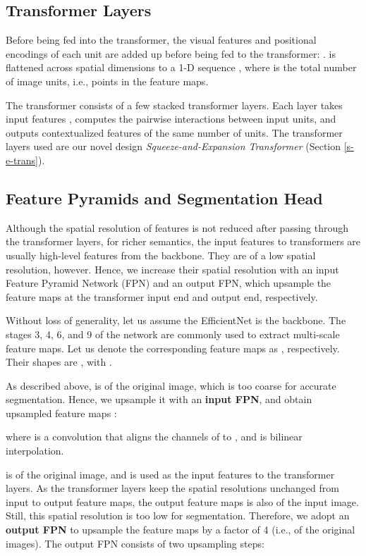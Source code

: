 \documentclass{article}
\begin{document}
\subsection{Transformer Layers}
Before being fed into the transformer, the visual features and positional encodings of each unit are added up before being fed to the transformer: . 
 is flattened across spatial dimensions to a 1-D sequence , where  is the total number of image units, i.e., points in the feature maps.

The transformer consists of a few stacked transformer layers. Each layer takes input features , computes the pairwise interactions between input units, and outputs contextualized features  of the same number of units.
The transformer layers used are our novel design \emph{Squeeze-and-Expansion Transformer} (Section \ref{s-e-trans}).

\subsection{Feature Pyramids and Segmentation Head}
Although the spatial resolution of features is not reduced after passing through the transformer layers, for richer semantics, the input features to transformers are usually high-level features from the backbone. They are of a low spatial resolution, however. Hence, we increase their spatial resolution with an input Feature Pyramid Network (FPN) \cite{panet} and an output FPN, which upsample the feature maps at the transformer input end and output end, respectively.

Without loss of generality, let us assume the EfficientNet is the backbone. The stages 3, 4, 6, and 9 of the network are commonly used to extract multi-scale feature maps. Let us denote the corresponding feature maps as , respectively. Their shapes are , with .

As described above,  is  of the original image, which is too coarse for accurate segmentation. Hence, we upsample it with an \textbf{input FPN}, and obtain upsampled feature maps :

where  is a  convolution that aligns the channels of  to , and  is bilinear interpolation.

 is  of the original image, and is used as the input features to the transformer layers. As the transformer layers keep the spatial resolutions unchanged from input to output feature maps, the output feature maps  is also  of the input image. Still, this spatial resolution is too low for segmentation. Therefore, we adopt an \textbf{output FPN} to upsample the feature maps by a factor of 4 (i.e.,  of the original images). The output FPN consists of two upsampling steps:
\end{document}
